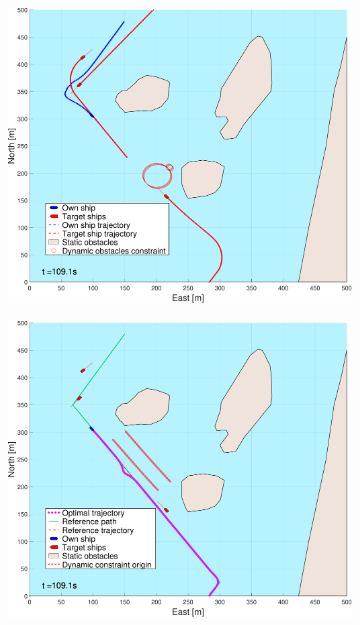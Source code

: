 \begin{figure}[!ht]
\begin{subfigure}[b]{0.494\textwidth}
        \subcaption{}
    \end{subfigure}
    \hfill
    \\
    \begin{subfigure}[b]{0.494\textwidth}
        \centering
        \includegraphics[width=\textwidth]{Images/NewFigures/Helloya_Rev/_Simple_0fig1_time=110}
        \subcaption{}
    \end{subfigure}
    \hfill
    \begin{subfigure}[b]{0.494\textwidth}
        \centering
        \includegraphics[width=\textwidth]{Images/NewFigures/Helloya_Rev/_Simple_0fig999_time=110}
        \subcaption{}
    \end{subfigure}
    \hfill
    \label{FIG: Helloya rev Simple pred}
\end{figure}%
